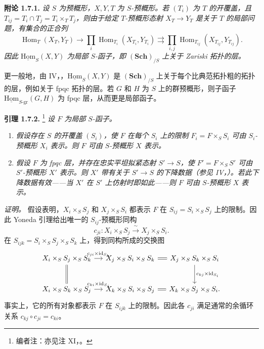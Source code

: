 \medskip
\noindent{}\textbf{附论 1.7.1.}
\textit{设 \(S\) 为预概形，\(X,Y,T\) 为 \(S\)-预概形。若 \((T_i)\) 为 \(T\) 的开覆盖，且 \(T_{ij}=T_i\cap T_j=T_i\times_TT_j\)，则由于给定 \(T\)-预概形态射 \(X_T\to Y_T\) 是关于 \(T\) 的局部问题，有集合的正合列}
\begin{equation}
  \tag{1}
  \operatorname{Hom}_T(X_T,Y_T)
  \longrightarrow
  \prod_i\operatorname{Hom}_{T_i}(X_{T_i},Y_{T_i})
  \rightrightarrows
  \prod_{i,j}\operatorname{Hom}_{T_{ij}}(X_{T_{ij}},Y_{T_{ij}}).
\end{equation}
\textit{因此 \(\operatorname{\underline{Hom}}_S(X,Y)\) 为局部 \(S\)-函子，即 \((\mathbf{Sch})_{/S}\) 上关于 Zariski 拓扑的层。}

更一般地，由 IV，，\(\operatorname{\underline{Hom}}_S(X,Y)\) 是 \((\mathbf{Sch})_{/S}\) 上关于每个比典范拓扑粗的拓扑的层，例如关于 fpqc 拓扑的层。若 \(G\) 和 \(H\) 为 \(S\) 上的群预概形，则子函子 \(\operatorname{\underline{Hom}}_{S\text{-}\mathrm{gr}}(G,H)\) 为 fpqc 层，从而更是局部函子。

\medskip
\noindent{}\textbf{引理 1.7.2.}
\footnote{编者注：亦见注 XI，。}
\textit{设 \(F\) 为局部 \(S\)-函子。}
\begin{enumerate}
  \item[(i)]
  \textit{假设存在 \(S\) 的开覆盖 \((S_i)\)，使 \(F\) 在每个 \(S_i\) 上的限制 \(F_i=F\times_SS_i\) 可由 \(S_i\)-预概形 \(X_i\) 表示。则 \(F\) 可由 \(S\)-预概形 \(X\) 表示。}

  \item[(ii)]
  \textit{假设 \(F\) 为 fpqc 层，并存在忠实平坦拟紧态射 \(S'\to S\)，使 \(F'=F\times_SS'\) 可由 \(S'\)-预概形 \(X'\) 表示。则 \(X'\) 带有关于 \(S'\to S\) 的下降数据（参见 IV，）。若此下降数据有效——当 \(X'\) 在 \(S'\) 上仿射时即如此——则 \(F\) 可由 \(S\)-预概形 \(X\) 表示。}
\end{enumerate}

\emph{证明。}
 假设表明，\(X_i\times_SS_j\) 和 \(X_j\times_SS_i\) 都表示 \(F\) 在 \(S_{ij}=S_i\times_SS_j\) 上的限制。因此 Yoneda 引理给出唯一的 \(S_{ij}\)-预概形同构
\[
  c_{ji}:X_i\times_SS_j\xrightarrow{\ \sim\ }X_j\times_SS_i.
\]
在 \(S_{ijk}=S_i\times_SS_j\times_SS_k\) 上，得到同构所成的交换图
\[
\begin{tikzcd}[column sep=small,row sep=large]
X_i\times_SS_j\times_SS_k
  \arrow[r,"c_{ji}\times\operatorname{id}_{S_k}"]
  \arrow[d,equal]
&
X_j\times_SS_i\times_SS_k
  \arrow[r,equal]
&
X_j\times_SS_k\times_SS_i
  \arrow[d,"c_{kj}\times\operatorname{id}_{S_i}"]
\\
X_i\times_SS_k\times_SS_j
  \arrow[r,"c_{ki}\times\operatorname{id}_{S_j}"]
&
X_k\times_SS_i\times_SS_j
  \arrow[r,equal]
&
X_k\times_SS_j\times_SS_i .
\end{tikzcd}
\]
事实上，它的所有对象都表示 \(F\) 在 \(S_{ijk}\) 上的限制。因此各 \(c_{ji}\) 满足通常的余循环关系 \(c_{kj}\circ c_{ji}=c_{ki}\)。

